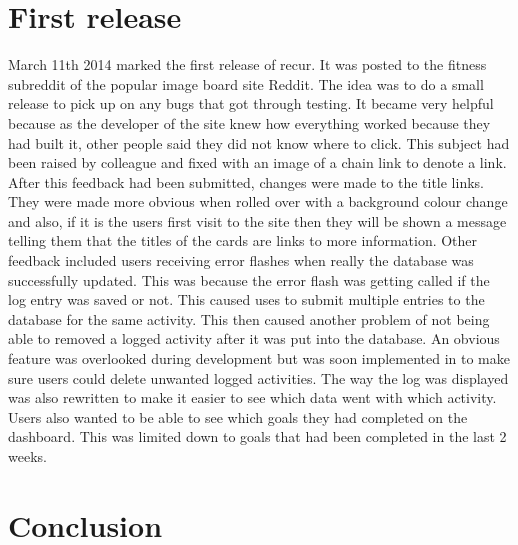 \section{First release}
March 11th 2014 marked the first release of recur. It was posted to the fitness subreddit of the popular image board site Reddit\citep{reddit:2005}. The idea was to do a small release to pick up on any bugs that got through testing. It became very helpful because as the developer of the site knew how everything worked because they had built it, other people said they did not know where to click. This subject had been raised by colleague and fixed with an image of a chain link to denote a link. After this feedback had been submitted, changes were made to the title links. They were made more obvious when rolled over with a background colour change and also, if it is the users first visit to the site then they will be shown a message telling them that the titles of the cards are links to more information. Other feedback included users receiving error flashes when really the database was successfully updated. This was because the error flash was getting called if the log entry was saved or not. This caused uses to submit multiple entries to the database for the same activity. This then caused another problem of not being able to removed a logged activity after it was put into the database. An obvious feature was overlooked during development but was soon implemented in to make sure users could delete unwanted logged activities. The way the log was displayed was also rewritten to make it easier to see which data went with which activity. Users also wanted to be able to see which goals they had completed on the dashboard. This was limited down to goals that had been completed in the last 2 weeks.


\section{Conclusion}